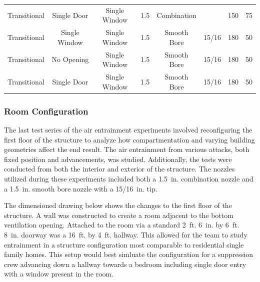 \documentclass{article}
\begin{document}
\begin{table}[!ht]
\begin{tabular}{lccccccc}
Transitional & Single Door & Single Window & 1.5 & Combination &  & 150 & 75 \\
Transitional & Single Window & Single Window & 1.5 & Smooth Bore & 15/16 & 180 & 50 \\
Transitional & No Opening & Single Window & 1.5 & Smooth Bore & 15/16 & 180 & 50 \\
Transitional & Single Door & Single Window & 1.5 & Smooth Bore & 15/16 & 180 & 50 \\ 
\bottomrule[1.25pt]
\end{tabular}
\end{table}

\clearpage

\subsubsection{Room Configuration}

The last test series of the air entrainment experiments involved reconfiguring the first floor of the structure to analyze how compartmentation and varying building geometries affect the end result. The air entrainment from various attacks, both fixed position and advancements, was studied. Additionally, the tests were conducted from both the interior and exterior of the structure. The nozzles utilized during these experiments included both a 1.5~in. combination nozzle and a 1.5~in. smooth bore nozzle with a 15/16~in. tip.

The dimensioned drawing below shows the changes to the first floor of the structure. A wall was constructed to create a room adjacent to the bottom ventilation opening. Attached to the room via a standard 2~ft. 6~in. by 6~ft. 8~in. doorway was a 16~ft. by 4~ft. hallway. This allowed for the team to study entrainment in a structure configuration most comparable to residential single family homes. This setup would best simluate the configuration for a suppression crew advancing down a hallway towards a bedroom including single door entry with a window present in the room. 
\end{document}

